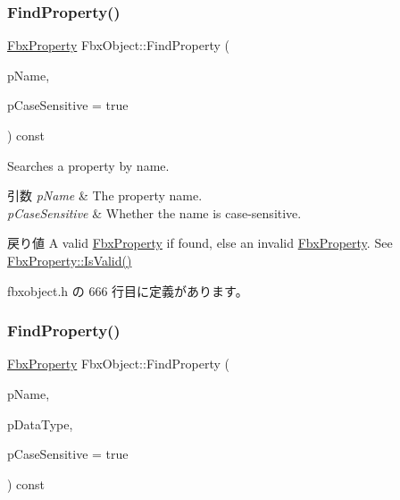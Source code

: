 \mbox{\label{class_fbx_object_a697319ff157f50b097f49118f5582f98}} 
\subsubsection{\texorpdfstring{Find\+Property()}{FindProperty()}\hspace{0.1cm}{\footnotesize\ttfamily [1/2]}}
{\footnotesize\ttfamily \hyperlink{class_fbx_property}{Fbx\+Property} Fbx\+Object\+::\+Find\+Property (\begin{DoxyParamCaption}\item[{const char $\ast$}]{p\+Name,  }\item[{bool}]{p\+Case\+Sensitive = {\ttfamily true} }\end{DoxyParamCaption}) const\hspace{0.3cm}{\ttfamily [inline]}}

Searches a property by name. 
\begin{DoxyParams}{引数}
{\em p\+Name} & The property name. \\
\hline
{\em p\+Case\+Sensitive} & Whether the name is case-\/sensitive. \\
\hline
\end{DoxyParams}
\begin{DoxyReturn}{戻り値}
A valid \hyperlink{class_fbx_property}{Fbx\+Property} if found, else an invalid \hyperlink{class_fbx_property}{Fbx\+Property}. See \hyperlink{class_fbx_property_a1c40042c55d1f4a1d4837f06fbc1d764}{Fbx\+Property\+::\+Is\+Valid()} 
\end{DoxyReturn}


 fbxobject.\+h の 666 行目に定義があります。

\mbox{\label{class_fbx_object_aab369c8ec541c9e6994a28015619e510}} 
\subsubsection{\texorpdfstring{Find\+Property()}{FindProperty()}\hspace{0.1cm}{\footnotesize\ttfamily [2/2]}}
{\footnotesize\ttfamily \hyperlink{class_fbx_property}{Fbx\+Property} Fbx\+Object\+::\+Find\+Property (\begin{DoxyParamCaption}\item[{const char $\ast$}]{p\+Name,  }\item[{const \hyperlink{class_fbx_data_type}{Fbx\+Data\+Type} \&}]{p\+Data\+Type,  }\item[{bool}]{p\+Case\+Sensitive = {\ttfamily true} }\end{DoxyParamCaption}) const\hspace{0.3cm}{\ttfamily [inline]}}


